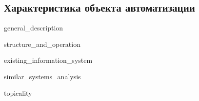 \subsection{Характеристика объекта автоматизации}


{general_description}


{structure_and_operation}


{existing_information_system}


{similar_systems_analysis}


{topicality}
